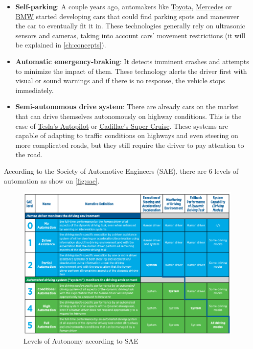 \begin{itemize}

  \item \textbf{Self-parking}: A couple years ago, automakers like \href{https://www.toyota-europe.com/world-of-toyota/safety-technology/parking-aids}{Toyota}, \href{https://www.mbusa.com/mercedes/technology/videos/detail/class-SL_Class/title-convenience/videoId-bef758b451127410VgnVCM100000ccec1e35RCRD}{Mercedes} or \href{https://www.bmw.co.uk/bmw-ownership/connecteddrive/driver-assistance/intelligent-parking}{BMW} started developing cars that could find parking spots and maneuver the car to eventually fit it in. These technologies generally rely on ultrasonic sensors and cameras, taking into account cars' movement restrictions  (it will be explained in \autoref{ch:concepts}).

  \item \textbf{Automatic emergency-braking}: It detects imminent crashes and attempts to minimize the impact of them. These technology alerts the driver first with visual or sound warnings and if there is no response, the vehicle stops immediately.

  \item \textbf{Semi-autonomous drive system}: There are already cars on the market that can drive themselves autonomously on highway conditions. This is the case of \href{https://www.tesla.com/autopilot?redirect=no}{Tesla's Autopilot} or \href{https://media.gm.com/media/us/en/cadillac/news.detail.html/content/Pages/news/us/en/2017/apr/0410-supercruise.html}{Cadillac's Super Cruise}. These systems are capable of adapting to traffic conditions on highways and even steering on more complicated roads, but they still require the driver to pay attention to the road.

\end{itemize}

According to the Society of Automotive Engineers (SAE), there are 6 levels of automation as show on \autoref{fig:sae}.

\begin{figure}[htb]
  \myfloatalign
  \includegraphics[width=\linewidth]{pictures/01/sae}
  \caption{Levels of Autonomy according to SAE}
  \label{fig:sae}
\end{figure} 

